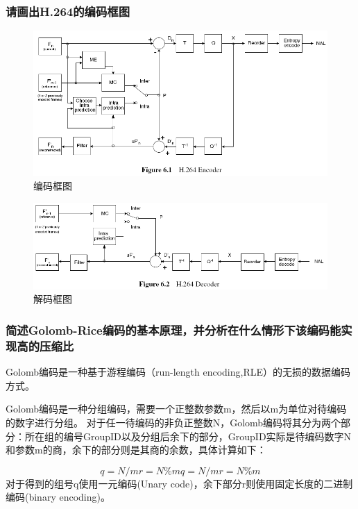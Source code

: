 \documentclass[UTF8,a4paper,AutoFakeBold,AutoFakeSlant]{ctexart}
\begin{document}
\subsubsection{请画出H.264的编码框图}

\begin{figure}[H]
	\centering
	\includegraphics[scale=0.6]{h264_enc.png}
	\caption{编码框图}
	\label{f:编码框图}
\end{figure}
\begin{figure}[H]
	\centering
	\includegraphics[scale=0.6]{h264_dec.png}
	\caption{解码框图}
	\label{f:解码框图}
\end{figure}


\subsubsection{简述Golomb-Rice编码的基本原理，并分析在什么情形下该编码能实现高的压缩比}

Golomb编码是一种基于游程编码（run-length encoding,RLE）的无损的数据编码方式。

Golomb编码是一种分组编码，需要一个正整数参数m，然后以m为单位对待编码的数字进行分组。
对于任一待编码的非负正整数N，Golomb编码将其分为两个部分：所在组的编号GroupID以及分组后余下的部分，GroupID实际是待编码数字N和参数m的商，余下的部分则是其商的余数，具体计算如下：

$$ q=N/mr=N\%mq=N/mr=N\%m $$ 
对于得到的组号q使用一元编码(Unary code)，余下部分r则使用固定长度的二进制编码(binary encoding)。
\end{document}
